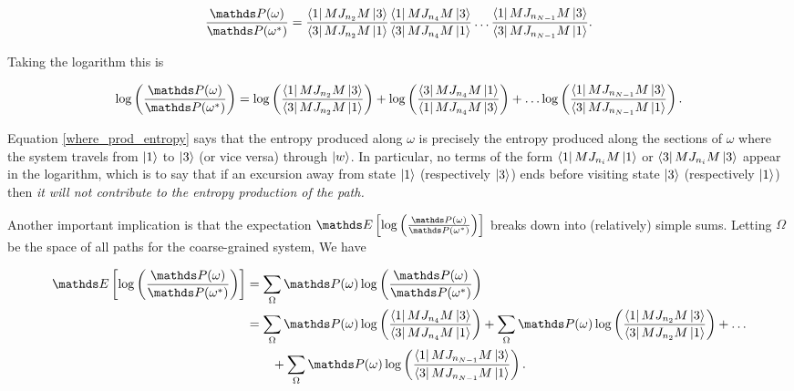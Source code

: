 \begin{equation}
  \frac{\bP(\omega)}{\bP(\omega^\ast)} = \frac{\bra{1}MJ_{n_2}M\ket{3}}{\bra{3}MJ_{n_2}M\ket{1}}\frac{\bra{1}MJ_{n_4}M\ket{3}}{\bra{3}MJ_{n_4}M\ket{1}}\ldots\frac{\bra{1}MJ_{n_{N-1}}M\ket{3}}{\bra{3}MJ_{n_{N-1}}M\ket{1}}.
\end{equation}

Taking the logarithm this is

\begin{equation}\label{where_prod_entropy}
  \log\left(\frac{\bP(\omega)}{\bP(\omega^\ast)} \right) = \log \left(\frac{\bra{1}MJ_{n_2}M\ket{3}}{\bra{3}MJ_{n_2}M\ket{1}} \right) + \log \left(\frac{\bra{3}MJ_{n_4}M\ket{1}}{\bra{1}MJ_{n_4}M\ket{3}} \right) + \ldots
  \log \left ( \frac{\bra{1}MJ_{n_{N-1}}M\ket{3}}{\bra{3}MJ_{n_{N-1}}M\ket{1}}\right).
\end{equation}

Equation \ref{where_prod_entropy} says that the entropy produced along $\omega$ is precisely the entropy produced along the sections of $\omega$ where the system travels from $\ket{1}$ to $\ket{3}$ (or vice versa) through $\ket{w}$. In particular, no terms of the form $\bra{1}MJ_{n_i}M\ket{1}$ or $\bra{3}MJ_{n_i}M\ket{3}$ appear in the logarithm, which is to say that if an excursion away from state $\ket{1}$ (respectively $\ket{3}$) ends before visiting state $\ket{3}$ (respectively $\ket{1}$) then \textit{it will not contribute to the entropy production of the path.}

Another important implication is that the expectation $ \bE\left[ \log\left(\frac{\bP(\omega)}{\bP(\omega^\ast)}\right)\right]$ breaks down into (relatively) simple sums. Letting $\Omega$ be the space of all paths for the coarse-grained system, We have

\begin{align}\label{broken_expec}
    \bE\left[ \log\left(\frac{\bP(\omega)}{\bP(\omega^\ast)}\right)\right] &= \sum_{\Omega} \bP(\omega)\log\left(\frac{\bP(\omega)}{\bP(\omega^\ast)}\right) \nonumber\\
    &= \sum_{\Omega} \bP(\omega)\log\left(\frac{\bra{1}MJ_{n_4}M\ket{3}}{\bra{3}MJ_{n_4}M\ket{1}}\right) +  \sum_{\Omega} \bP(\omega)\log\left(\frac{\bra{1}MJ_{n_{2}}M\ket{3}}{\bra{3}MJ_{n_{2}}M\ket{1}}\right) + \ldots \nonumber \\ &\qquad + \sum_{\Omega} \bP(\omega)\log\left(\frac{\bra{1}MJ_{n_{N-1}}M\ket{3}}{\bra{3}MJ_{n_{N-1}}M\ket{1}}\right).
\end{align}

